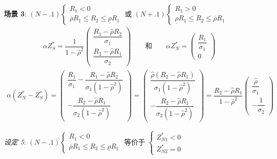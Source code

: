 \documentclass[10.0pt]{article}
\begin{document}
{\bf 场景 3}: $ (N-.1) \left\{ \begin{matrix} R_1 < 0 \\ \overline{\rho} R_1 \leqslant R_2 \leqslant \underline{\rho} R_1 \end{matrix} \right. $ 或 $ (N+.1) \left\{ \begin{matrix} R_1 > 0 \\ \underline{\rho} R_1 \leqslant R_2 \leqslant \overline{\rho} R_1 \end{matrix} \right. $
\begin{eqnarray*}
\alpha Z_S^* = \dfrac1{1 - {\hat \rho}^2} \left( \begin{matrix} \dfrac{R_1 - {\hat \rho} R_2}{\sigma_1} \\ \dfrac{R_2 - {\hat \rho} R_1}{\sigma_2} \end{matrix} \right) \qquad \text{和} \qquad \alpha Z_N^* = \left( \begin{matrix} \dfrac{R_1}{\sigma_1} \\ 0 \end{matrix} \right)
\end{eqnarray*}
\begin{eqnarray*}
\alpha (Z_N^* - Z_S^*) = \left( \begin{matrix} \dfrac{R_1}{\sigma_1} - \dfrac{R_1 - {\hat \rho} R_2}{\sigma_1 (1 - {\hat \rho}^2)} \\ - \dfrac{R_2 - {\hat \rho} R_1}{\sigma_2 (1 - {\hat \rho}^2)} \end{matrix} \right) = \left( \begin{matrix} \dfrac{{\hat \rho} (R_2 - {\hat \rho} R_1)}{\sigma_1 (1 - {\hat \rho}^2)} \\ - \dfrac{R_2 - {\hat \rho} R_1}{\sigma_2 (1 - {\hat \rho}^2)} \end{matrix} \right) = \dfrac{R_2 - {\hat \rho} R_1}{1 - {\hat \rho}^2} \left( \begin{matrix} \dfrac{{\hat \rho}}{\sigma_1} \\ - \dfrac{1}{\sigma_2} \end{matrix} \right)
\end{eqnarray*}

{\it 设定 5}: $ (N-.1) \left\{ \begin{matrix} R_1 < 0 \\ \overline{\rho} R_1 \leqslant R_2 \leqslant \underline{\rho} R_1 \end{matrix} \right. $ 等价于 $ \left\{ \begin{matrix} Z_{N 1}^* < 0 \\ Z_{N 2}^* = 0 \end{matrix} \right. $
\end{document}
